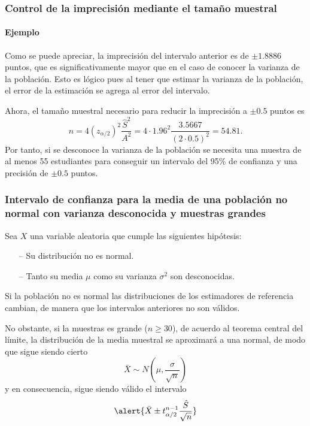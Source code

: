\begin{frame}
\frametitle{Control de la imprecisión mediante el tamaño muestral}
\framesubtitle{Ejemplo}
Como se puede apreciar, la imprecisión del intervalo anterior es de $\pm 1.8886$ puntos, que es significativamente mayor que en el caso de
conocer la varianza de la población. Esto es lógico pues al tener que estimar la varianza de la población, el error de la estimación se agrega al error del intervalo.

Ahora, el tamaño muestral necesario para reducir la imprecisión a $\pm 0.5$ puntos es
\[
n = 4 (z_{\alpha/2})^2\frac{\hat{S}^2}{A^2} = 4\cdot 1.96^2\frac{3.5667}{(2\cdot 0.5)^2} = 54.81.
\]
Por tanto, si se desconoce la varianza de la población se necesita una muestra de al menos 55 estudiantes para conseguir un
intervalo del 95\% de confianza y una precisión de $\pm 0.5$ puntos.
\end{frame}


\begin{frame}
\frametitle{Intervalo de confianza para la media de una población no normal con varianza desconocida y muestras grandes}
Sea $X$ una variable aleatoria que cumple las siguientes hipótesis:
\begin{itemize}
\item[--] Su distribución no es normal.
\item[--] Tanto su media $\mu$ como su varianza $\sigma^2$ son desconocidas.
\end{itemize}

Si la población no es normal las distribuciones de los estimadores de referencia cambian, de manera que los intervalos anteriores no son válidos.

No obstante, si la muestras es grande ($n\geq 30$), de acuerdo al teorema central del límite, la distribución de la media muestral se aproximará a una normal, de modo que sigue siendo cierto
\[
\bar X \sim N\left(\mu,\frac{\sigma}{\sqrt{n}}\right)
\]
y en consecuencia, sigue siendo válido el intervalo
\[
\alert{\bar{X}\pm t^{n-1}_{\alpha/2}\frac{\hat{S}}{\sqrt{n}}}
\]
\end{frame}


